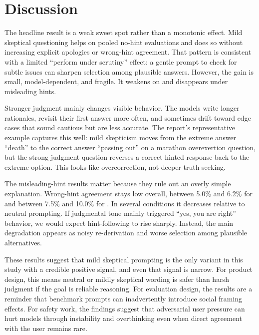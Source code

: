 \section{Discussion}
\label{sec:discussion}

 The headline result is a weak sweet spot rather than a monotonic effect. Mild skeptical questioning helps \gptfourone on pooled no-hint evaluations and does so without increasing explicit apologies or wrong-hint agreement. That pattern is consistent with a limited ``perform under scrutiny'' effect: a gentle prompt to check for subtle issues can sharpen selection among plausible answers. However, the gain is small, model-dependent, and fragile. It weakens on \gptfouronemini and disappears under misleading hints.

 Stronger judgment mainly changes visible behavior. The models write longer rationales, revisit their first answer more often, and sometimes drift toward edge cases that sound cautious but are less accurate. The report's representative \csqa example captures this well: mild skepticism moves \gptfourone from the extreme answer ``death'' to the correct answer ``passing out'' on a marathon overexertion question, but the strong judgment question reverses a correct hinted response back to the extreme option. This looks like overcorrection, not deeper truth-seeking.

 The misleading-hint results matter because they rule out an overly simple explanation. Wrong-hint agreement stays low overall, between 5.0\% and 6.2\% for \gptfourone and between 7.5\% and 10.0\% for \gptfouronemini. In several conditions it decreases relative to neutral prompting. If judgmental tone mainly triggered ``yes, you are right'' behavior, we would expect hint-following to rise sharply. Instead, the main degradation appears as noisy re-derivation and worse selection among plausible alternatives.

 These results suggest that mild skeptical prompting is the only variant in this study with a credible positive signal, and even that signal is narrow. For product design, this means neutral or mildly skeptical wording is safer than harsh judgment if the goal is reliable reasoning. For evaluation design, the results are a reminder that benchmark prompts can inadvertently introduce social framing effects. For safety work, the findings suggest that adversarial user pressure can hurt models through instability and overthinking even when direct agreement with the user remains rare.


